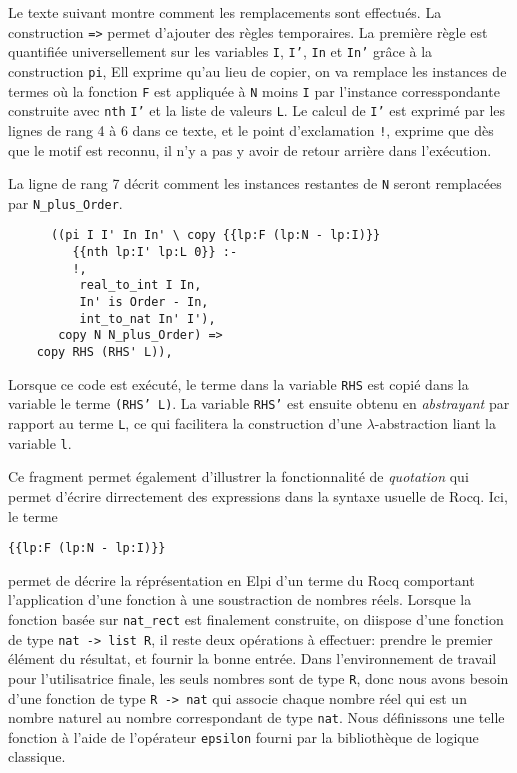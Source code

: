 \documentclass[draft]{jflart}
\begin{document}
Le texte suivant montre comment les remplacements sont effectués.  La
construction \texttt{=>} permet d'ajouter des règles temporaires.
La première règle est quantifiée universellement sur les variables
\texttt{I}, \texttt{I'}, \texttt{In} et \texttt{In'} grâce à la construction \texttt{pi},
Ell exprime qu'au lieu de copier, on va remplace les instances de termes
où la fonction \texttt{F} est
appliquée à \texttt{N} moins \texttt{I} par l'instance
corresspondante construite avec \texttt{nth} \texttt{I'} et la liste de
valeurs
\texttt{L}.  Le calcul de \texttt{I'} est exprimé par les lignes de rang 4 à 6 dans
ce texte, et le point d'exclamation \texttt{!}, exprime que dès que le
motif est reconnu, il n'y a pas y avoir de retour arrière dans l'exécution.

La ligne de rang 7 décrit comment les instances restantes de \texttt{N} seront
remplacées par \texttt{N\_plus\_Order}.
\begin{verbatim}
      ((pi I I' In In' \ copy {{lp:F (lp:N - lp:I)}}
         {{nth lp:I' lp:L 0}} :-
         !,
          real_to_int I In,
          In' is Order - In,
          int_to_nat In' I'),
       copy N N_plus_Order) =>
    copy RHS (RHS' L)),
\end{verbatim}
Lorsque ce code est exécuté, le terme dans la variable \texttt{RHS} est copié
dans la variable le terme \texttt{(RHS' L)}.  La variable \texttt{RHS'} est ensuite
obtenu en {\em abstrayant} par rapport au terme \texttt{L}, ce qui facilitera
la construction d'une \(\lambda\)-abstraction liant la variable \texttt{l}.

Ce fragment permet également d'illustrer la fonctionnalité de {\em
  quotation} qui permet d'écrire dirrectement des expressions dans la
syntaxe usuelle de Rocq.  Ici, le terme
\begin{center}
\texttt{\{\{lp:F (lp:N -  lp:I)\}\}}
\end{center}
permet de décrire la réprésentation en Elpi d'un terme du
Rocq comportant l'application d'une fonction à une soustraction de
nombres réels.
Lorsque la fonction basée sur \texttt{nat\_rect} est finalement
construite, on diispose d'une fonction de type \texttt{nat -> list R}, il
reste deux opérations à effectuer: prendre le premier élément du
résultat, et fournir la bonne entrée.  Dans l'environnement de travail
pour l'utilisatrice finale, les seuls nombres sont de type \texttt{R},
donc nous avons besoin d'une fonction de type \texttt{R -> nat} qui
associe chaque nombre réel qui est un nombre naturel au nombre
correspondant de type \texttt{nat}.  Nous définissons une telle fonction
à l'aide de l'opérateur \texttt{epsilon} fourni par la bibliothèque de
logique classique.
\end{document}
